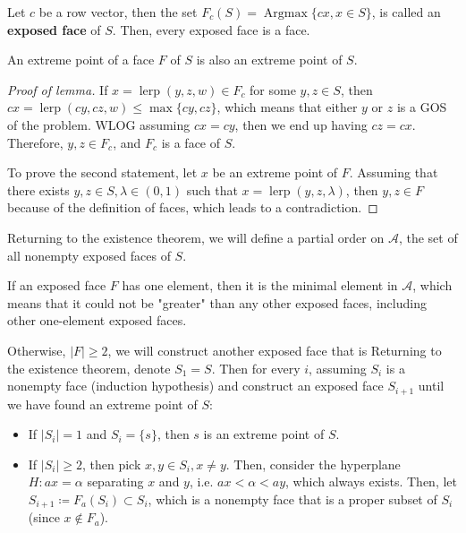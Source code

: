 \begin{lemma}
\label{lem:xtreme-pt}
  Let \( c \) be a row vector, then the set \( F_{c}(S) = \operatorname{Argmax}
  \{cx, x \in S\}     \), is called an \textbf{exposed face} of \( S \). Then,
  every exposed face is a face.

  An extreme point of a face \( F \) of \( S \) is also an extreme point of \( S
  \).
\end{lemma}

\begin{proof}[Proof of lemma]
  If \( x = \operatorname{lerp}(y,z, w) \in F_{c} \) for some \( y,z \in S \),
  then \( cx = \operatorname{lerp}(cy, cz, w) \le \max \{cy, cz\}   \), which
  means that either \( y \) or \( z \) is a GOS of the problem. WLOG assuming \(
  cx = cy\), then we end up having \( cz = cx \). Therefore, \( y, z \in F_{c}
  \), and \( F_{c} \) is a face of \( S \).

  To prove the second statement, let \( x \) be an extreme point of \( F \).
  Assuming that there exists \( y, z \in S, \lambda \in (0, 1) \) such that \( x =
  \operatorname{lerp}(y, z, \lambda) \), then \( y, z \in F \) because of the
  definition of faces, which leads to a contradiction.
\end{proof}

Returning to the existence theorem, we will define a partial order on \(
\mathcal{A} \), the set of all nonempty exposed faces of \( S \).

If an exposed face \( F \) has one element, then it is the minimal element
in \( \mathcal{A} \),
which means that it could not be "greater" than any other exposed faces,
including other one-element exposed faces.

Otherwise, \( |F| \ge 2 \), we will construct another exposed face that is 
Returning to the existence theorem, denote
\( S_{1} = S \). Then for every \( i \), assuming \( S_{i} \) is a
nonempty face (induction hypothesis) and construct an exposed face \( S_{i+1} \) until we
have found an extreme point of \( S \):
\begin{itemize}
  \item If \( |S_{i}| = 1 \) and \( S_{i} = \{ s\}   \), then \( s \) is an
    extreme point of \( S \).
  \item If \( |S_{i}| \ge  2 \), then pick \( x, y \in S_{i}, x \neq y \). Then,
    consider the hyperplane \( H: ax = \alpha \) separating \( x \) and \( y \),
    i.e. \( ax < \alpha < ay \), which always exists. Then, let \( S_{i+1}
    \coloneqq F_{a}(S_{i}) \subset S_{i} \), which is a nonempty face that is a
    proper subset of \( S_{i} \) (since \( x \notin F_{a} \)).
\end{itemize}

